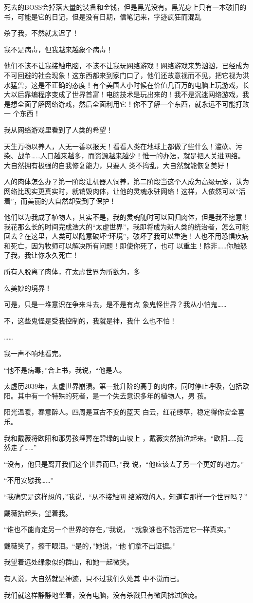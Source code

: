 \documentclass{article}
\begin{document}
死去的BOSS会掉落大量的装备和金钱，但是黑光没有。黑光身上只有一本破旧的书，可能是它的日记，但是没有日期，信笔记来，字迹疯狂而混乱


杀了我，不然就太迟了！ 


我不是病毒，但我越来越象个病毒！ 

他们不该不让我接触电脑，不该不让我玩网络游戏！网络游戏来势汹汹，已经成为不可回避的社会现象！这东西都来到家门口了，他们还故意视而不见，把它视为洪水猛兽，这是不正确的态度！有个美国人小时候在价值几百万的电脑上玩游戏，长大以后靠编程序变成了世界首富！电脑技术是玩出来的！我不是沉迷网络游戏，我是想全面了解网络游戏，然后全面利用它！你不了解一个东西，就永远不可能打败一
个东西！ 


我从网络游戏里看到了人类的希望！ 

\newpage

天生万物以养人，人无一善以报天！看看人类在地球上都做了些什么！滥砍、污染、战争……人口越来越多，而资源越来越少！惟一的办法，就是把人关进网络。大自然拥有极强的自我修复能力，只要人
类不捣乱，大自然就能恢复美好！ 

人的肉体怎么办？第一阶段让机器人饲养，第二阶段当这个人成为高级玩家，认为网络比现实更真实时，就销毁肉体，让他的灵魂永驻网络！这样，人依然可以“活着”，而美丽的大自然却受到了保护！

他们以为我成了植物人，其实不是，我的灵魂随时可以回归肉体，但是我不愿意！我花那么长的时间完成浩大的“太虚世界”，我即将成为新人类的统治者，怎么可能回去？在这里，人类可以随意破坏“环境”，破坏了我可以重造！人也不用恐惧疾病和死亡，因为牧师可以解决所有问题！即使你死了，也可
以重生！除非……你触怒了我，我让你永久死亡！ 

所有人脱离了肉体，在太虚世界为所欲为，多

\newpage
么美妙的境界！ 

可是，只是一堆意识在争来斗去，是不是有点
象鬼怪世界？我从小怕鬼…… 

不，这些鬼怪是受我控制的，我就是神，我什
么也不怕！ 


…… 


我一声不响地看完。 

“他不是病毒，”合上书，我说，“他是人。

太虚历2039年，太虚世界崩溃。第一批升阶的高手的肉体，同时停止呼吸，包括欧阳。其中有一个特殊的死者，是一个失去意识多年的植物人，男
孩。 

阳光温暖，春意醉人。四周是亘古不变的蓝天
白云，红花绿草，稳定得你安全喜乐。 

\newpage

我和戴薇将欧阳和那男孩埋葬在碧绿的山坡上
，戴薇突然抽泣起来。“欧阳……竟然走了……” 

“没有，他只是离开我们这个世界而已，”我
说，“他应该去了另一个更好的地方。” 


“不用安慰我……” 

“我确实是这样想的，”我说，“从不接触网
络游戏的人，知道有那样一个世界吗？” 


戴薇抬起头，望着我。 

“谁也不能肯定另一个世界的存在，”我说，
“就象谁也不能否定它一样真实。” 

戴薇笑了，擦干眼泪。“是的，”她说，“他
们拿不出证据。” 


我望着远处绿象似的群山，和她一起微笑。 

\newpage

有人说，大自然就是神迹，只不过我们久处其
中不觉而已。 

我们就这样静静地坐着，没有电脑，没有杀戮只有微风拂过脸庞。
\end{document}
